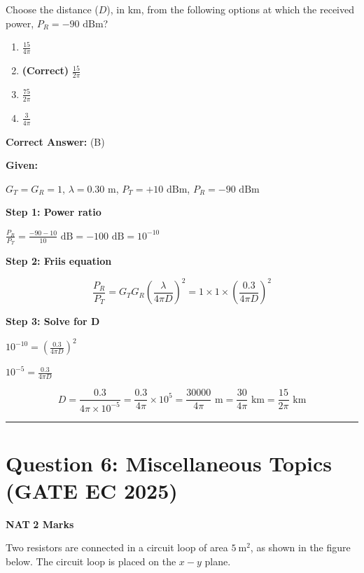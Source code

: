 \documentclass[11pt,a4paper]{article}
\begin{document}
 Choose the distance ($D$), in km, from the following options at which the received power, $P_R = -90 \text{ dBm}$?


\begin{enumerate}[label=(\Alph*)]
    \item $\frac{15}{4\pi}$
    \item \textbf{(Correct)} $\frac{15}{2\pi}$
    \item $\frac{75}{2\pi}$
    \item $\frac{3}{4\pi}$
\end{enumerate}

\noindent \textbf{Correct Answer:} (B)

\begin{tcolorbox}[solbox, title=Detailed Solution -- Question 5]
\textbf{Given:}

$G_T=G_R=1$, $\lambda=0.30\text{ m}$, $P_T=+10\text{ dBm}$, $P_R=-90\text{ dBm}$

\textbf{Step 1: Power ratio}

$\frac{P_R}{P_T} = \frac{-90-10}{10}\text{ dB} = -100\text{ dB} = 10^{-10}$

\textbf{Step 2: Friis equation}

\[
\frac{P_R}{P_T} = G_T G_R \left(\frac{\lambda}{4\pi D}\right)^2 = 1\times1\times\left(\frac{0.3}{4\pi D}\right)^2
\]

\textbf{Step 3: Solve for D}

$10^{-10} = \left(\frac{0.3}{4\pi D}\right)^2$

$10^{-5} = \frac{0.3}{4\pi D}$

\[
D = \frac{0.3}{4\pi \times 10^{-5}} = \frac{0.3}{4\pi}\times10^5 = \frac{30000}{4\pi}\text{ m} = \frac{30}{4\pi}\text{ km} = \frac{15}{2\pi}\text{ km}
\]
\end{tcolorbox}

\vspace{1.5em}
\hrule
\vspace{1.5em}

\section*{Question 6: Miscellaneous Topics (GATE EC 2025)}
\noindent \textbf{\color{primary}NAT} \hfill \textbf{\color{secondary}2 Marks}


\noindent Two resistors are connected in a circuit loop of area $5 \mathrm{~m}^{2}$, as shown in the figure below. The circuit loop is placed on the $x-y$ plane.
\end{document}
